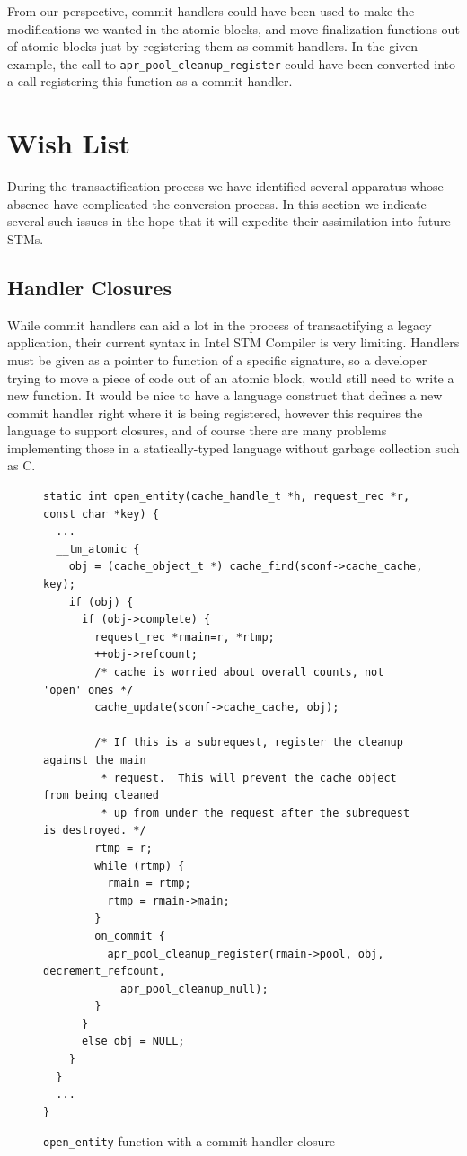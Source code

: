 \documentclass[preprint,11pt]{sigplanconf}
\begin{document}
From our perspective, commit handlers could have been used to make the
modifications we wanted in the atomic blocks, and move finalization functions
out of atomic blocks just by registering them as commit handlers. In the given
example, the call to {\tt apr\_pool\_cleanup\_register} could have been
converted into a call registering this function as a commit handler. 


\section{Wish List}\label{sec:wishlist} 
During the transactification process we have identified several apparatus whose
absence have complicated the conversion process. In this section we indicate
several such issues in the hope that it will expedite their assimilation into
future STMs.

\subsection{Handler Closures}
While commit handlers can aid a lot in the process of transactifying a legacy
application, their current syntax in Intel STM Compiler is very limiting.
Handlers must be given as a pointer to function of a specific signature, so a
developer trying to move a piece of code out of an atomic block, would still
need to write a new function. It would be nice to have a language construct that
defines a new commit handler right where it is being registered, however this
requires the language to support closures, and of course there are many problems
implementing those in a statically-typed language without garbage collection
such as C.

\begin{figure}
\begin{lstlisting}
static int open_entity(cache_handle_t *h, request_rec *r, const char *key) {
  ...
  __tm_atomic {
    obj = (cache_object_t *) cache_find(sconf->cache_cache, key);
    if (obj) {
      if (obj->complete) {
        request_rec *rmain=r, *rtmp;
        ++obj->refcount;
        /* cache is worried about overall counts, not 'open' ones */
        cache_update(sconf->cache_cache, obj);

        /* If this is a subrequest, register the cleanup against the main
         * request.  This will prevent the cache object from being cleaned
         * up from under the request after the subrequest is destroyed. */
        rtmp = r;
        while (rtmp) {
          rmain = rtmp;
          rtmp = rmain->main;
        }
        on_commit {
          apr_pool_cleanup_register(rmain->pool, obj, decrement_refcount, 
            apr_pool_cleanup_null);
        }
      }
      else obj = NULL;
    }
  }
  ...
}
\end{lstlisting}
\caption{{\tt open\_entity} function with a commit handler closure}
\label{code:closure-open-entity}
\end{figure}
\end{document}
